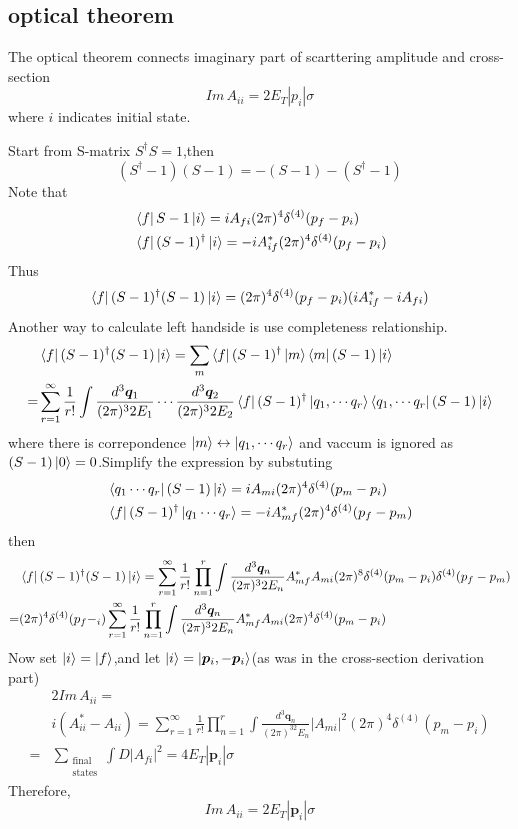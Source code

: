 \documentclass[a4paper]{article}
\begin{document}
\subsection{optical theorem}
The optical theorem connects imaginary part of scarttering amplitude and cross-section$$Im\,A_{ii}=2E_T|p_{i}|\sigma$$
where $i$ indicates initial state.
\par Start from S-matrix $S^{\dagger}S=1$,then$$(S^{\dagger}-1)(S-1)=-(S-1)-(S^{\dagger}-1)$$Note that
\begin{align*}
	&\bra{f}S-1\ket{i}=iA_{fi}(2\pi)^4\delta^{(4)}(p_f-p_i)\\
	&\bra{f}(S-1)^{\dagger}\ket{i}=-iA_{if}^*(2\pi)^4\delta^{(4)}(p_f-p_i)\\
\end{align*}
Thus$$\bra{f}(S-1)^{\dagger}(S-1)\ket{i}=(2\pi)^4\delta^{(4)}(p_f-p_i)(iA^*_{if}-iA_{fi})$$
Another way to calculate left handside is use completeness relationship.
\begin{align*}
	&\bra{f}(S-1)^{\dagger}(S-1)\ket{i}=\sum_{m}\bra{f}(S-1)^{\dagger}\ket{m}\bra{m}(S-1)\ket{i}\\=&\sum_{r=1}^{\infty}\frac{1}{r!}\int\frac{d^3\bm{q}_1}{(2\pi)^32E_1}\cdots\frac{d^3\bm{q}_2}{(2\pi)^32E_2}\bra{f}(S-1)^{\dagger}\ket{q_1,\cdots q_r}\bra{q_1,\cdots q_r}(S-1)\ket{i}
\end{align*}
where there is correpondence $\ket{m}\leftrightarrow\ket{q_1,\cdots q_r}$ and vaccum is ignored as $(S-1)\ket{0}=0$.Simplify the expression by substuting
\begin{align*}
	&\bra{q_1\cdots q_r}(S-1)\ket{i}=iA_{mi}(2\pi)^4\delta^{(4)}(p_m-p_i)\\
	&\bra{f}(S-1)^{\dagger}\ket{q_1\cdots q_r}=-iA_{mf}^*(2\pi)^4\delta^{(4)}(p_f-p_m)
\end{align*}
then
\begin{align*}
	&\bra{f}(S-1)^{\dagger}(S-1)\ket{i}=\sum_{r=1}^{\infty}\frac{1}{r!}\prod_{n=1}^{r}\int \frac{d^3\bm{q}_n}{(2\pi)^32E_n}A^*_{mf}A_{mi}(2\pi)^8\delta^{(4)}(p_m-p_i)\delta^{(4)}(p_f-p_m)\\=&(2\pi)^4\delta^{(4)}(p_f-_i)\sum_{r=1}^{\infty}\frac{1}{r!}\prod_{n=1}^{r}\int\frac{d^3\bm{q}_n}{(2\pi)^32E_n}A^*_{mf}A_{mi}(2\pi)^4\delta^{(4)}(p_m-p_i)
\end{align*}
Now set $\ket{i}=\ket{f}$,and let $\ket{i}=\ket{\bm{p}_i,-\bm{p}_i}$(as was in the cross-section derivation part)
\begin{align*}
&2Im\,A_{ii}=\\
&i(A_{ii}^*-A_{ii})=\sum_{r=1}^{\infty}\frac{1}{r!}\prod_{n=1}^{r}\int\frac{d^3\bm{q}_n}{(2\pi)^32E_n}|A_{mi}|^2(2\pi)^4\delta^{(4)}(p_m-p_i)\\=&\sum_{\substack{\text{final}\\ \text{states}}}\int D|A_{fi}|^2=4E_T|\bm{p}_i|\sigma
\end{align*}
Therefore,$$Im\,A_{ii}=2E_T|\bm{p}_i|\sigma$$
\end{document}
